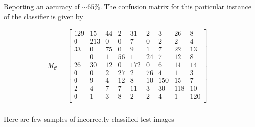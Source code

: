 \begin{homeworkProblem}
\pagebreak

Reporting an accuracy of $\sim 65 \%$. The confusion matrix for this particular
instance of the classifier is given by

\begin{align*}
  M_\mathcal{C} = \begin{bmatrix}
    129 & 15 & 44 & 2 & 31 & 2 & 3 & 26 & 8\\
    0 & 213 & 0 & 0 & 7 & 0 & 2 & 2 & 4\\
    33 & 0 & 75 & 0 & 9 & 1 & 7 & 22 & 13\\
    1 & 0 & 1 & 56 & 1 & 24 & 7 & 12 & 8\\
    26 & 30 & 12 & 0 & 172 & 0 & 6 & 14 & 14\\
    0 & 0 & 2 & 27 & 2 & 76 & 4 & 1 & 3\\
    0 & 9 & 4 & 12 & 8 & 10 & 150 & 15 & 7\\
    2 & 4 & 7 & 7 & 11 & 3 & 30 & 118 & 10\\
    0 & 1 & 3 & 8 & 2 & 2 & 4 & 1 & 120\\
  \end{bmatrix}
\end{align*}
\\

Here are few samples of incorrectly classified test images
\\


\end{homeworkProblem}
